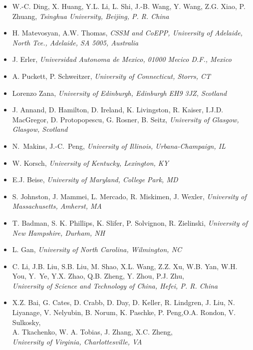 \begin{itemize}
\item W.-C. Ding, X. Huang, Y.L. Li, L. Shi, J.-B. Wang, Y. Wang,  
Z.G. Xiao, P. Zhuang, 
\emph{Tsinghua University, Beijing, P. R. China}
  
\item H. Matevosyan, A.W. Thomas,  
\emph{CSSM and CoEPP, University of Adelaide, North Tce., Adelaide, SA 5005, Australia}
  
\item J. Erler, 
\emph{Universidad Autonoma de Mexico, 01000 Mecico D.F., Mexico}
  
\item A. Puckett, P. Schweitzer, 
\emph{University of Connecticut, Storrs, CT}
  
\item Lorenzo Zana, 
\emph{University of Edinburgh, Edinburgh EH9 3JZ, Scotland}
 
\item J. Annand, D. Hamilton, D. Ireland, K. Livingston, R. Kaiser,
I.J.D. MacGregor, D. Protopopescu, G. Rosner, B. Seitz,  
\emph{University of Glasgow, Glasgow, Scotland}
  
\item N.~Makins, J.-C.~Peng,    
\emph{University of Illinois, Urbana-Champaign, IL}
  
\item W. Korsch,  
\emph{University of Kentucky, Lexington, KY}
 
\item E.J. Beise,  
\emph{University of Maryland, College Park, MD}
 
\item S. Johnston, J. Mammei, L. Mercado, R. Miskimen, J. Wexler,  
\emph{University of Massachusetts, Amherst, MA}
  
\item T. Badman, S. K. Phillips, K. Slifer, P. Solvignon, R. Zielinski, 
\emph{University of New Hampshire, Durham, NH}
  
\item L. Gan,  
\emph{University of North Carolina, Wilmington, NC}
  
\item C. Li, J.B. Liu, S.B. Liu, M. Shao, X.L. Wang, Z.Z. Xu, W.B. Yan, W.H. You,
Y.~Ye, Y.X. Zhao, Q.B. Zheng, Y. Zhou, P.J. Zhu,  \\
\emph{University of Science and Technology of China, Hefei, P. R. China}
  
\item X.Z. Bai, G. Cates, D. Crabb, D. Day, D. Keller, R. Lindgren,
  J. Liu, N. Liyanage, V. Nelyubin, 
  B. Norum,  K. Paschke, P. Peng,O.A. Rondon, V. Sulkosky, \\ A. Tkachenko, W. A. Tobias, J. Zhang, X.C. Zheng,  \\   
\emph{University of Virginia, Charlottesville, VA}
  

\end{itemize}
